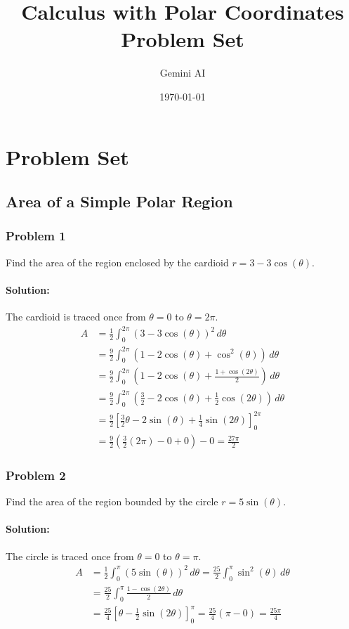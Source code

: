 \documentclass{article}
\title{Calculus with Polar Coordinates Problem Set}
\author{Gemini AI}
\date{\today}
\begin{document}
\maketitle

\section*{Problem Set}


\subsection*{Area of a Simple Polar Region}

\subsubsection*{Problem 1}
Find the area of the region enclosed by the cardioid $r = 3 - 3\cos(\theta)$.
\paragraph{Solution:}
The cardioid is traced once from $\theta = 0$ to $\theta = 2\pi$.
\begin{align*} A &= \frac{1}{2} \int_{0}^{2\pi} (3 - 3\cos(\theta))^2 \,d\theta \\ &= \frac{9}{2} \int_{0}^{2\pi} (1 - 2\cos(\theta) + \cos^2(\theta)) \,d\theta \\ &= \frac{9}{2} \int_{0}^{2\pi} \left(1 - 2\cos(\theta) + \frac{1 + \cos(2\theta)}{2}\right) \,d\theta \\ &= \frac{9}{2} \int_{0}^{2\pi} \left(\frac{3}{2} - 2\cos(\theta) + \frac{1}{2}\cos(2\theta)\right) \,d\theta \\ &= \frac{9}{2} \left[\frac{3}{2}\theta - 2\sin(\theta) + \frac{1}{4}\sin(2\theta)\right]_{0}^{2\pi} \\ &= \frac{9}{2} \left(\frac{3}{2}(2\pi) - 0 + 0\right) - 0 = \frac{27\pi}{2} \end{align*}

\subsubsection*{Problem 2}
Find the area of the region bounded by the circle $r = 5\sin(\theta)$.
\paragraph{Solution:}
The circle is traced once from $\theta = 0$ to $\theta = \pi$.
\begin{align*} A &= \frac{1}{2} \int_{0}^{\pi} (5\sin(\theta))^2 \,d\theta = \frac{25}{2} \int_{0}^{\pi} \sin^2(\theta) \,d\theta \\ &= \frac{25}{2} \int_{0}^{\pi} \frac{1 - \cos(2\theta)}{2} \,d\theta \\ &= \frac{25}{4} \left[\theta - \frac{1}{2}\sin(2\theta)\right]_{0}^{\pi} = \frac{25}{4} (\pi - 0) = \frac{25\pi}{4} \end{align*}
\end{document}
